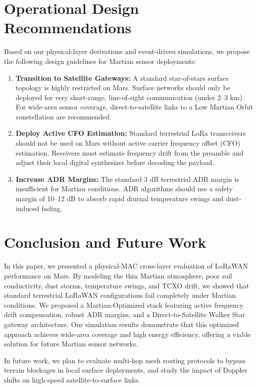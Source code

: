 \documentclass[journal,10pt,doublecolumn]{IEEEtran}
\begin{document}
\section{Operational Design Recommendations}
\label{sec:discussion}
Based on our physical-layer derivations and event-driven simulations, we propose the following design guidelines for Martian sensor deployments:
\begin{enumerate}
    \item \textbf{Transition to Satellite Gateways:} A standard star-of-stars surface topology is highly restricted on Mars. Surface networks should only be deployed for very short-range, line-of-sight communication (under 2--3 km). For wide-area sensor coverage, direct-to-satellite links to a Low Martian Orbit constellation are recommended.
    \item \textbf{Deploy Active CFO Estimation:} Standard terrestrial LoRa transceivers should not be used on Mars without active carrier frequency offset (CFO) estimation. Receivers must estimate frequency drift from the preamble and adjust their local digital synthesizer before decoding the payload.
    \item \textbf{Increase ADR Margins:} The standard 3 dB terrestrial ADR margin is insufficient for Martian conditions. ADR algorithms should use a safety margin of 10--12 dB to absorb rapid diurnal temperature swings and dust-induced fading.
\end{enumerate}

\section{Conclusion and Future Work}
\label{sec:conclusion}
In this paper, we presented a physical-MAC cross-layer evaluation of LoRaWAN performance on Mars. By modeling the thin Martian atmosphere, poor soil conductivity, dust storms, temperature swings, and TCXO drift, we showed that standard terrestrial LoRaWAN configurations fail completely under Martian conditions. We proposed a Martian-Optimized stack featuring active frequency drift compensation, robust ADR margins, and a Direct-to-Satellite Walker Star gateway architecture. Our simulation results demonstrate that this optimized approach achieves wide-area coverage and high energy efficiency, offering a viable solution for future Martian sensor networks.

In future work, we plan to evaluate multi-hop mesh routing protocols to bypass terrain blockages in local surface deployments, and study the impact of Doppler shifts on high-speed satellite-to-surface links.



\end{document}

